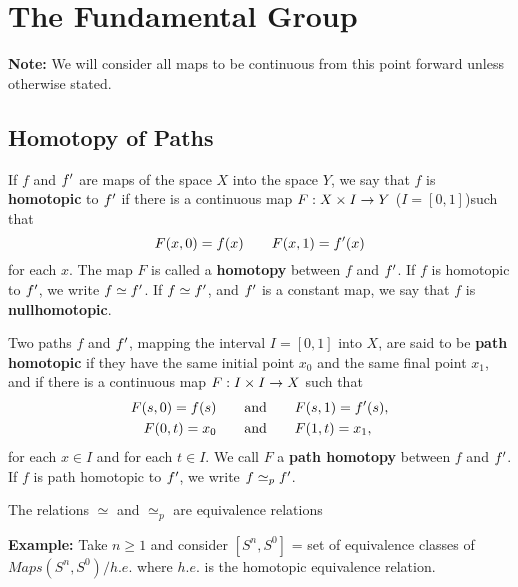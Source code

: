 \newpage
\setcounter{section}{8}
\section{The Fundamental Group}
\vs

\textbf{Note:} We will consider all maps to be continuous from this point forward unless otherwise stated.

\subsection{Homotopy of Paths}\nl
\setcounter{section}{51}
\setcounter{thm}{0}


\dfn If $f$ and $f^\prime$ are maps of the space $X$ into the space $Y$, we say that $f$ is \textbf{homotopic} to $f^\prime$ if there is a continuous map $F:X\times I\rightarrow Y$ ($I = [0,1]$)such that
\[F(x, 0) = f(x) \qquad F(x,1) = f^\prime(x)\]
for each $x$. The map $F$ is called a \textbf{homotopy} between $f$ and $f^\prime$. If $f$ is homotopic to $f^\prime$, we write $f\simeq f^\prime$. If $f\simeq f^\prime$, and $f^\prime$ is a constant map, we say that $f$ is \textbf{nullhomotopic}.

\vs

\dfn Two paths $f$ and $f^\prime$, mapping the interval $I = [0,1]$ into $X$, are said to be \textbf{path homotopic} if they have the same initial point $x_0$ and the same final point $x_1$, and if there is a continuous map $F:I\times I\rightarrow X$ such that
\begin{align*}
    F(s, 0) = f(s) \qquad&\text{and}\qquad F(s,1) = f^\prime(s),\\
    F(0,t) = x_0 \qquad&\text{and}\qquad F(1,t) = x_1,
\end{align*}
for each $x\in I$ and for each $t\in I$. We call $F$ a \textbf{path homotopy} between $f$ and $f^\prime$. If $f$ is path homotopic to $f^\prime$, we write $f\simeq_p f^\prime$.

\vs

\begin{lem}
The relations $\simeq$ and $\simeq_p$ are equivalence relations
\end{lem}

\vs

\textbf{Example:} Take $n \geq 1$ and consider $[S^n, S^0]$ = set of equivalence classes of $Maps(S^n, S^0)/h.e.$ where $h.e.$ is the homotopic equivalence relation.

